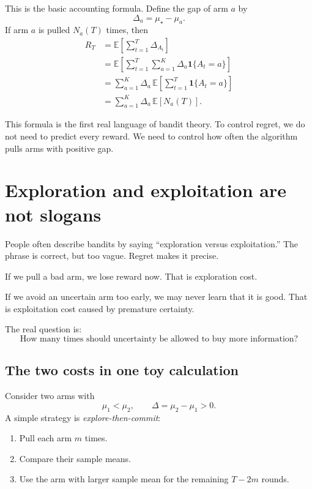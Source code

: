 \documentclass[en,nofont,11pt]{elegantbook}
\newcommand{\E}{\mathbb{E}}
\newcommand{\ind}{\mathbf{1}}
\begin{document}
This is the basic accounting formula.  Define the gap of arm $a$ by
\[
\Delta_a=\mu_\star-\mu_a.
\]
If arm $a$ is pulled $N_a(T)$ times, then
\[
\begin{aligned}
R_T
&=
\E\left[\sum_{t=1}^T \Delta_{A_t}\right] \\[0.3em]
&=
\E\left[\sum_{t=1}^T\sum_{a=1}^K \Delta_a\ind\{A_t=a\}\right] \\[0.3em]
&=
\sum_{a=1}^K
\Delta_a\,
\E\left[\sum_{t=1}^T \ind\{A_t=a\}\right] \\[0.3em]
&=
\boxed{
\sum_{a=1}^K \Delta_a\,\E[N_a(T)].
}
\end{aligned}
\]

\begin{think}
This formula is the first real language of bandit theory.  To control regret, we do not need to predict every reward.  We need to control how often the algorithm pulls arms with positive gap.
\end{think}

\chapter{Exploration and exploitation are not slogans}

People often describe bandits by saying ``exploration versus exploitation.''  The phrase is correct, but too vague.  Regret makes it precise.

If we pull a bad arm, we lose reward now.  That is exploration cost.

If we avoid an uncertain arm too early, we may never learn that it is good.  That is exploitation cost caused by premature certainty.

The real question is:
\[
\text{How many times should uncertainty be allowed to buy more information?}
\]

\section{The two costs in one toy calculation}

Consider two arms with
\[
\mu_1<\mu_2,\qquad \Delta=\mu_2-\mu_1>0.
\]
A simple strategy is \emph{explore-then-commit}:

\begin{enumerate}
\item Pull each arm $m$ times.
\item Compare their sample means.
\item Use the arm with larger sample mean for the remaining $T-2m$ rounds.
\end{enumerate}
\end{document}
